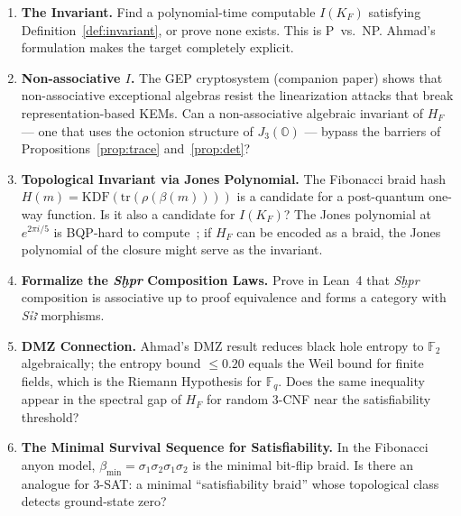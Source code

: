 \documentclass[11pt,letterpaper]{article}
\begin{document}
\begin{enumerate}

\item \textbf{The Invariant.}  Find a polynomial-time computable $I(K_F)$
  satisfying Definition~\ref{def:invariant}, or prove none exists.  This is
  P~vs.~NP.  Ahmad's formulation makes the target completely explicit.

\item \textbf{Non-associative $I$.}  The GEP cryptosystem (companion paper)
  shows that non-associative exceptional algebras resist the linearization
  attacks that break representation-based KEMs.  Can a non-associative
  algebraic invariant of $H_F$ --- one that uses the octonion structure of
  $J_3(\mathbb{O})$ --- bypass the barriers of Propositions~\ref{prop:trace}
  and~\ref{prop:det}?

\item \textbf{Topological Invariant via Jones Polynomial.}  The Fibonacci
  braid hash $H(m) = \mathrm{KDF}(\mathrm{tr}(\rho(\beta(m))))$ is a
  candidate for a post-quantum one-way function.  Is it also a candidate
  for $I(K_F)$?  The Jones polynomial at $e^{2\pi i/5}$ is BQP-hard to
  compute~\cite{aharonov2009}; if $H_F$ can be encoded as a braid, the
  Jones polynomial of the closure might serve as the invariant.

\item \textbf{Formalize the \textit{Sḫpr} Composition Laws.}  Prove in
  Lean~4 that \textit{Sḫpr} composition is associative up to proof
  equivalence and forms a category with \textit{Sỉꜣ} morphisms.

\item \textbf{DMZ Connection.}  Ahmad's DMZ result reduces black hole entropy
  to $\mathbb{F}_2$ algebraically; the entropy bound $\leq 0.20$ equals the
  Weil bound for finite fields, which is the Riemann Hypothesis for $\mathbb{F}_q$.
  Does the same inequality appear in the spectral gap of $H_F$ for random 3-CNF
  near the satisfiability threshold?

\item \textbf{The Minimal Survival Sequence for Satisfiability.}  In the
  Fibonacci anyon model, $\beta_{\min} = \sigma_1\sigma_2\sigma_1\sigma_2$
  is the minimal bit-flip braid.  Is there an analogue for 3-SAT: a minimal
  ``satisfiability braid'' whose topological class detects ground-state zero?
\end{enumerate}

\end{document}
